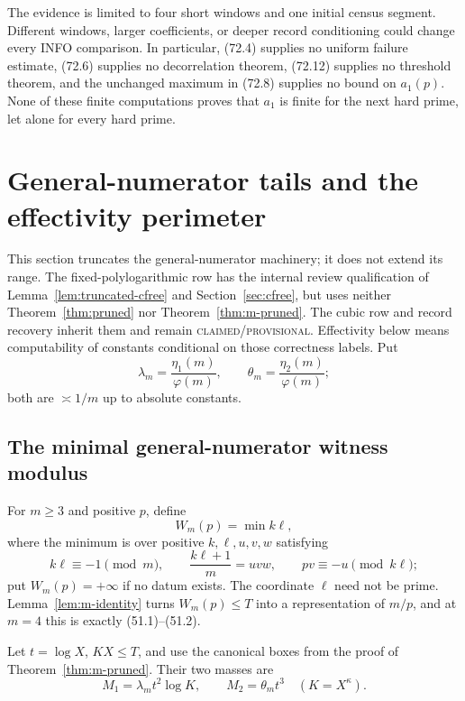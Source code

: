 \documentclass[10pt,reqno]{amsart}
\theoremstyle{definition}
\newcommand{\1}{\mathbf 1}
\begin{document}
The evidence is limited to four short windows and one initial census segment.
Different windows, larger coefficients, or deeper record conditioning could
change every INFO comparison.  In particular, (72.4) supplies no uniform
failure estimate, (72.6) supplies no decorrelation theorem, (72.12) supplies
no threshold theorem, and the unchanged maximum in (72.8) supplies no bound
on $a_1(p)$.  None of these finite computations proves that $a_1$ is
finite for the next hard prime, let alone for every hard prime.

\section{General-numerator tails and the effectivity perimeter}
\label{sec:general-m-tails}
This section truncates the general-numerator machinery; it does not extend
its range.  The fixed-polylogarithmic row has the internal review
qualification of Lemma~\ref{lem:truncated-cfree} and Section~\ref{sec:cfree},
but uses neither Theorem~\ref{thm:pruned} nor
Theorem~\ref{thm:m-pruned}.  The cubic row and record recovery inherit them
and remain \textsc{claimed/provisional}.  Effectivity below means
computability of constants conditional on those correctness labels.  Put
\begin{equation}\tag{55.1}
 \lambda_m=\frac{\eta_1(m)}{\varphi(m)},\qquad
 \theta_m=\frac{\eta_2(m)}{\varphi(m)};
\end{equation}
both are $\asymp1/m$ up to absolute constants.

\subsection{The minimal general-numerator witness modulus}
For $m\geq3$ and positive $p$, define
\begin{equation}\tag{55.2}
 W_m(p)=\min k\ell,
\end{equation}
where the minimum is over positive $k,\ell,u,v,w$ satisfying
\begin{equation}\tag{55.3}
 k\ell\equiv-1\pmod m,\qquad \frac{k\ell+1}{m}=uvw,
 \qquad pv\equiv-u\pmod {k\ell};
\end{equation}
put $W_m(p)=+\infty$ if no datum exists.  The coordinate $\ell$ need not be
prime.  Lemma~\ref{lem:m-identity} turns $W_m(p)\leq T$ into a representation
of $m/p$, and at $m=4$ this is exactly (51.1)--(51.2).

Let $t=\log X$, $KX\leq T$, and use the canonical boxes from the proof of
Theorem~\ref{thm:m-pruned}.  Their two masses are
\begin{equation}\tag{55.4}
 M_1=\lambda_mt^2\log K,
 \qquad M_2=\theta_mt^3\quad(K=X^\kappa).
\end{equation}
\end{document}
